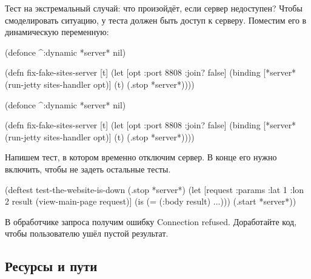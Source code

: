 Тест на экстремальный случай: что произойдёт, если сервер недоступен? Чтобы
смоделировать ситуацию, у теста должен быть доступ к серверу. Поместим его в
динамическую переменную:


\ifx\DEVICETYPE\MOBILE

\begin{english}
  \begin{clojure}
(defonce ^:dynamic *server* nil)

(defn fix-fake-sites-server [t]
  (let [opt {:port 8808 :join? false}]
    (binding [*server*
              (run-jetty
                sites-handler opt)]
      (t)
      (.stop *server*))))
  \end{clojure}
\end{english}

\else

\begin{english}
  \begin{clojure}
(defonce ^:dynamic *server* nil)

(defn fix-fake-sites-server [t]
  (let [opt {:port 8808 :join? false}]
    (binding [*server*
              (run-jetty sites-handler opt)]
      (t)
      (.stop *server*))))
  \end{clojure}
\end{english}

\fi

Напишем тест, в котором временно отключим сервер. В конце его нужно включить,
чтобы не задеть остальные тесты.

\begin{english}
  \begin{clojure}
(deftest test-the-website-is-down
  (.stop *server*)
  (let [request {:params {:lat 1 :lon 2}}
        result (view-main-page request)]
    (is (= (:body result) {...})))
  (.start *server*))
  \end{clojure}
\end{english}

В обработчике запроса получим ошибку Connection refused. Доработайте код,
чтобы пользователю ушёл пустой результат.

\subsection{Ресурсы и пути}

\label{resources}


